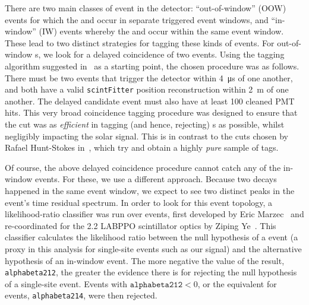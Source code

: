 There are two main classes of  event in the detector: ``out-of-window'' (OOW) events for which the  and  occur in separate triggered event windows, and ``in-window'' (IW) events whereby the  and  occur within the same event window. These lead to two distinct strategies for tagging these kinds of events. For out-of-window s, we look for a delayed coincidence of two events. Using the tagging algorithm suggested in~\cite{wilsonBiPoRejectionFactors2017,kroupovaImprovingSensitivityNeutrinoless2020} %
as a starting point, the chosen procedure was as follows. There must be two events that trigger the detector within \SI{4}{\micro\second} of one another, and both have a valid \texttt{scintFitter} position reconstruction within \SI{2}{\metre} of one another. The delayed candidate event must also have at least 100 cleaned PMT hits. %
This very broad coincidence tagging procedure was designed to ensure that the cut was as \textit{efficient} in tagging (and hence, rejecting) s as possible, whilst negligibly impacting the solar signal. This is in contrast to the cuts chosen by Rafael Hunt-Stokes in~\cite{hunt-stokesUraniumThoriumBackground2022}, %
which try and obtain a highly \textit{pure} sample of  tags.

Of course, the above delayed coincidence procedure cannot catch any of the in-window  events. For these, we use a different approach. Because two decays happened in the same event window, we expect to see two distinct peaks in the event's time residual spectrum. In order to look for this event topology, a likelihood-ratio classifier was run over events, first developed by Eric Marzec~\cite{marzecBiPoEventReduction2013} %
and re-coordinated for the \SI{2.2}{\gpl} LABPPO scintillator optics by Ziping Ye~\cite{yeTaggingInwindowBiPo2022}. %
This classifier calculates the likelihood ratio between the null hypothesis of a \onbb{} event (a proxy in this analysis for single-site events such as our \beight{} signal) and the alternative hypothesis of an in-window  event. The more negative the value of the result, \texttt{alphabeta212}, the greater the evidence there is for rejecting the null hypothesis of a single-site event. Events with $\texttt{alphabeta212} < 0$, %
or the equivalent for  events, \texttt{alphabeta214}, were then rejected.

